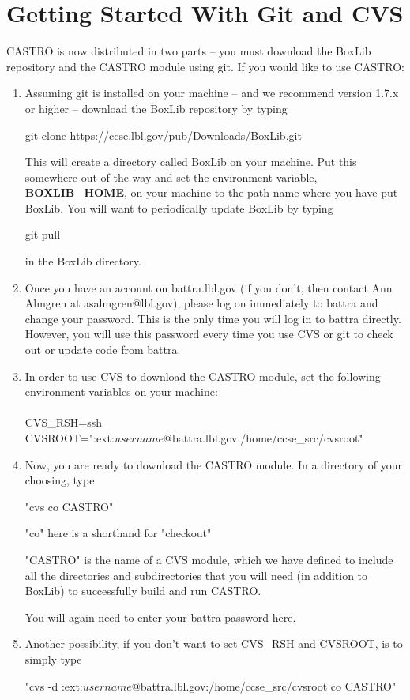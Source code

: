 
\section{Getting Started With Git and CVS}

CASTRO is now distributed in two parts -- you must download the BoxLib repository and the CASTRO module 
using git.  If you would like to use CASTRO:

\begin{enumerate}

\item Assuming git is installed on your machine -- and we recommend version 1.7.x or higher -- download the
BoxLib repository by typing 

\noindent git clone https://ccse.lbl.gov/pub/Downloads/BoxLib.git 

\noindent This will create a directory called BoxLib on your machine.  Put this somewhere out of the way and 
set the environment variable, {\bf BOXLIB\_HOME}, on your machine to the path name where
you have put BoxLib.    You will want to periodically update BoxLib by typing 

\noindent git pull

in the BoxLib directory.  

\item Once you have an account on battra.lbl.gov (if you don't, then contact Ann Almgren at asalmgren@lbl.gov),
please log on immediately to battra and change your password.
This is the only time you will log in to battra directly.  However, you will use this password every
time you use CVS or git to check out or update code from battra.

\item In order to use CVS to download the CASTRO module, set the following environment variables on your machine: \\ \\ 
CVS\_RSH=ssh \\
CVSROOT=":ext:$username$@battra.lbl.gov:/home/ccse\_src/cvsroot" 

\item Now, you are ready to download the CASTRO module.  In a directory of your choosing, type 

"cvs co CASTRO"

"co" here is a shorthand for "checkout"

"CASTRO" is the name of a CVS module, which we have defined to include all the directories and subdirectories 
that you will need (in addition to BoxLib) to successfully build and run CASTRO.

You will again need to enter your battra password here.

\item Another possibility, if you don't want to set CVS\_RSH and CVSROOT, is to simply type

"cvs -d :ext:$username$@battra.lbl.gov:/home/ccse\_src/cvsroot co CASTRO"

\end{enumerate}

